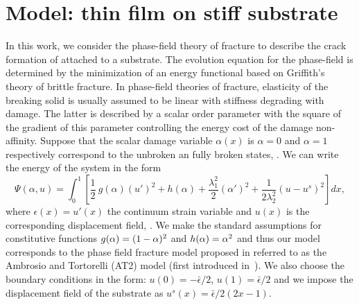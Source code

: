 \section{Model: thin film on stiff substrate}
\label{sec:rigid}
In this work, we consider the phase-field theory of fracture to describe the crack formation of  attached to a substrate. The evolution equation for the phase-field is determined by the minimization of an energy functional based on Griffith's theory of brittle fracture.
In phase-field theories of fracture, elasticity of the breaking solid is usually assumed to be linear with stiffness degrading with damage. The latter is described by a scalar order parameter with the square of the gradient of this parameter controlling the energy cost of the damage non-affinity.
Suppose that the scalar damage variable $\alpha(x)$ is  $\alpha=0$ and $\alpha=1$ respectively correspond to the unbroken an fully broken states, . We can write the energy of the system in the  form
\begin{equation}
\label{modeld}
\Psi(\alpha, u) = \int_{0}^{1} \left[ \frac{1}{2} \ g(\alpha)(u')^2 + h(\alpha) + \frac{\lambda_1^2}{2}(\alpha')^2 
+ \frac{1}{2 \lambda_2^2} (u-u^s)^2 \right] dx,
\end{equation}
where $\epsilon(x)=u'(x)$ the continuum strain variable and $u(x)$ is the corresponding displacement field, . 
We make the standard assumptions for constitutive functions  $g(\alpha) =(1-\alpha)^2$ and $h(\alpha) =\alpha^2$ and thus our model corresponds to the  phase field fracture model proposed  in  \cite{Bourdin2000-pc,Miehe2010-sj,Miehe2010-ja} referred to as the Ambrosio and Tortorelli (AT2) model (first introduced in~\cite{at}). We also choose the boundary conditions in the form: $u(0)=-\bar\epsilon/2$, $u(1)=\bar\epsilon/2$ and we impose the displacement field  of the substrate   as $u^s(x)=\bar \epsilon/2 (2x-1)$.
